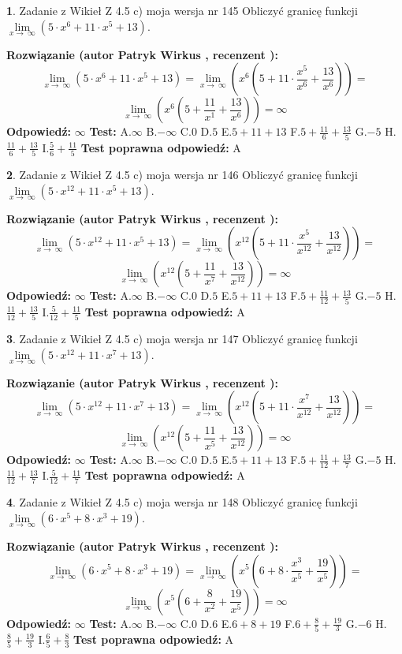 \documentclass[12pt, a4paper]{article}
\theoremstyle{definition} %
\newtheorem{zad}{}
\newcommand{\zadStart}[1]{\begin{zad}#1\newline}
\newcommand{\zadStop}{\end{zad}}
\newcommand{\rozwStart}[2]{\noindent \textbf{Rozwiązanie (autor #1 , recenzent #2): }\newline}
\newcommand{\rozwStop}{\newline}
\newcommand{\odpStart}{\noindent \textbf{Odpowiedź:}\newline}
\newcommand{\odpStop}{\newline}
\newcommand{\testStart}{\noindent \textbf{Test:}\newline}
\newcommand{\testStop}{\newline}
\newcommand{\kluczStart}{\noindent \textbf{Test poprawna odpowiedź:}\newline}
\newcommand{\kluczStop}{\newline}
\begin{document}
\zadStart{Zadanie z Wikieł Z 4.5 c) moja wersja nr 145}
Obliczyć granicę funkcji  $\lim\limits_{x\to\ \infty}(5 \cdot x^{6}+11 \cdot x^{5}+13)$.
\zadStop
\rozwStart{Patryk Wirkus}{}
$$\lim\limits_{x\to\ \infty}(5 \cdot x^{6}+11 \cdot x^{5}+13) = \lim\limits_{x\to\ \infty}(x^{6}(5 +11 \cdot \frac{x^{5}}{x^{6}}+\frac{13}{x^{6}})) =$$ $$\lim\limits_{x\to\ \infty}(x^{6}(5 +\frac{11}{x^{1}}+\frac{13}{x^{6}})) =\infty$$
\rozwStop
\odpStart
$\infty$
\odpStop
\testStart
A.$\infty$ B.$-\infty$ C.$0$ D.$5$ E.$5 + 11 + 13$
F.$5+\frac{11}{6}+\frac{13}{5}$ G.$-5$
H.$\frac{11}{6}+\frac{13}{5}$
I.$\frac{5}{6}+\frac{11}{5}$
\testStop
\kluczStart
A
\kluczStop



\zadStart{Zadanie z Wikieł Z 4.5 c) moja wersja nr 146}
Obliczyć granicę funkcji  $\lim\limits_{x\to\ \infty}(5 \cdot x^{12}+11 \cdot x^{5}+13)$.
\zadStop
\rozwStart{Patryk Wirkus}{}
$$\lim\limits_{x\to\ \infty}(5 \cdot x^{12}+11 \cdot x^{5}+13) = \lim\limits_{x\to\ \infty}(x^{12}(5 +11 \cdot \frac{x^{5}}{x^{12}}+\frac{13}{x^{12}})) =$$ $$\lim\limits_{x\to\ \infty}(x^{12}(5 +\frac{11}{x^{7}}+\frac{13}{x^{12}})) =\infty$$
\rozwStop
\odpStart
$\infty$
\odpStop
\testStart
A.$\infty$ B.$-\infty$ C.$0$ D.$5$ E.$5 + 11 + 13$
F.$5+\frac{11}{12}+\frac{13}{5}$ G.$-5$
H.$\frac{11}{12}+\frac{13}{5}$
I.$\frac{5}{12}+\frac{11}{5}$
\testStop
\kluczStart
A
\kluczStop



\zadStart{Zadanie z Wikieł Z 4.5 c) moja wersja nr 147}
Obliczyć granicę funkcji  $\lim\limits_{x\to\ \infty}(5 \cdot x^{12}+11 \cdot x^{7}+13)$.
\zadStop
\rozwStart{Patryk Wirkus}{}
$$\lim\limits_{x\to\ \infty}(5 \cdot x^{12}+11 \cdot x^{7}+13) = \lim\limits_{x\to\ \infty}(x^{12}(5 +11 \cdot \frac{x^{7}}{x^{12}}+\frac{13}{x^{12}})) =$$ $$\lim\limits_{x\to\ \infty}(x^{12}(5 +\frac{11}{x^{5}}+\frac{13}{x^{12}})) =\infty$$
\rozwStop
\odpStart
$\infty$
\odpStop
\testStart
A.$\infty$ B.$-\infty$ C.$0$ D.$5$ E.$5 + 11 + 13$
F.$5+\frac{11}{12}+\frac{13}{7}$ G.$-5$
H.$\frac{11}{12}+\frac{13}{7}$
I.$\frac{5}{12}+\frac{11}{7}$
\testStop
\kluczStart
A
\kluczStop



\zadStart{Zadanie z Wikieł Z 4.5 c) moja wersja nr 148}
Obliczyć granicę funkcji  $\lim\limits_{x\to\ \infty}(6 \cdot x^{5}+8 \cdot x^{3}+19)$.
\zadStop
\rozwStart{Patryk Wirkus}{}
$$\lim\limits_{x\to\ \infty}(6 \cdot x^{5}+8 \cdot x^{3}+19) = \lim\limits_{x\to\ \infty}(x^{5}(6 +8 \cdot \frac{x^{3}}{x^{5}}+\frac{19}{x^{5}})) =$$ $$\lim\limits_{x\to\ \infty}(x^{5}(6 +\frac{8}{x^{2}}+\frac{19}{x^{5}})) =\infty$$
\rozwStop
\odpStart
$\infty$
\odpStop
\testStart
A.$\infty$ B.$-\infty$ C.$0$ D.$6$ E.$6 + 8 + 19$
F.$6+\frac{8}{5}+\frac{19}{3}$ G.$-6$
H.$\frac{8}{5}+\frac{19}{3}$
I.$\frac{6}{5}+\frac{8}{3}$
\testStop
\kluczStart
A
\kluczStop
\end{document}
